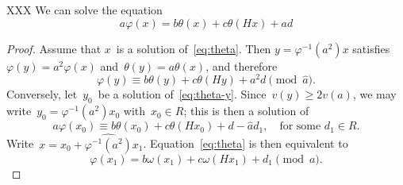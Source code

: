 \documentclass{llncs}
\begin{document}
\begin{proposition}\label{prop:eq}
XXX We can solve the equation
\begin{equation}\label{eq:theta}
a φ(x) = b θ(x) + c θ(Hx) + ad
\end{equation}
\end{proposition}

\begin{proof}
Assume that $x$~is a solution of~\eqref{eq:theta}. Then $y = φ^{-1}(a^2)
x$ satisfies~$φ(y) = a^2 φ(x)$ and~$θ(y) = a θ(x)$, and therefore
\begin{equation}\label{eq:theta-y}
φ(y) ≡ b θ(y) + c θ(Hy) + a^2d \pmod{\widehat{a}}.
\end{equation}
Conversely, let~$y_0$~be a solution of~\eqref{eq:theta-y}. Since~$v(y) ≥
2 v(a)$, we may write~$y_0 = φ^{-1}(a^2) x_0$ with~$x_0 ∈ R$; this is
then a solution of
\begin{equation}\label{eq:theta-x0}
a φ(x_0) ≡ b θ(x_0) + c θ(H x_0) + d - \widehat{a} d_1,\quad
\text{for some~$d_1 ∈ R$.}
\end{equation}
Write~$x = x_0 + \widehat{φ^{-1}(a^2)} x_1$. Equation~\eqref{eq:theta} is
then equivalent to
\begin{equation}\label{eq:omega-x1}
φ(x_1) = b ω(x_1) + c ω(H x_1) + d_1 \pmod{a}.
\end{equation}
\end{proof}
\end{document}
